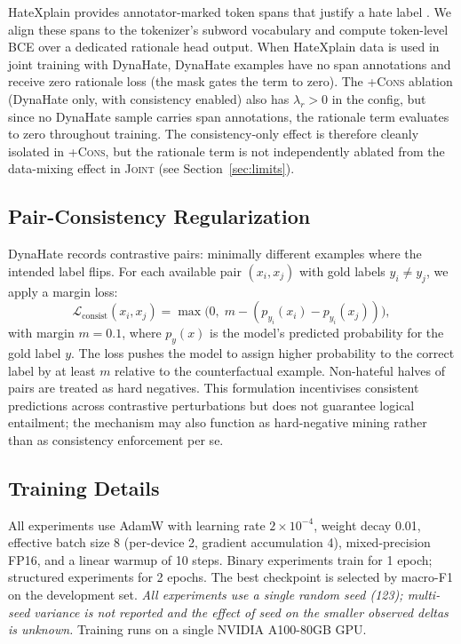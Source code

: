 \documentclass{article}
\begin{document}
HateXplain provides annotator-marked token spans that justify a hate label
\citep{mathew2021hatexplain}.
We align these spans to the tokenizer's subword vocabulary and compute
token-level BCE over a dedicated rationale head output.
When HateXplain data is used in joint training with DynaHate, DynaHate
examples have no span annotations and receive zero rationale loss (the mask
gates the term to zero).
The \textsc{+Cons} ablation (DynaHate only, with consistency enabled) also has
$\lambda_r > 0$ in the config, but since no DynaHate sample carries span
annotations, the rationale term evaluates to zero throughout training.
The consistency-only effect is therefore cleanly isolated in \textsc{+Cons},
but the rationale term is not independently ablated from the data-mixing
effect in \textsc{Joint} (see Section~\ref{sec:limits}).

\subsection{Pair-Consistency Regularization}
\label{sec:consistency}

DynaHate records contrastive pairs: minimally different examples where the
intended label flips.
For each available pair $(x_i, x_j)$ with gold labels $y_i \neq y_j$, we
apply a margin loss:
\begin{equation}
  \mathcal{L}_\text{consist}(x_i, x_j)
    = \max\!\bigl(0,\; m - (p_{y_i}(x_i) - p_{y_i}(x_j))\bigr),
\end{equation}
with margin $m=0.1$, where $p_{y}(x)$ is the model's predicted probability
for the gold label $y$.
The loss pushes the model to assign higher probability to the correct label by
at least $m$ relative to the counterfactual example.
Non-hateful halves of pairs are treated as hard negatives.
This formulation incentivises consistent predictions across contrastive
perturbations but does not guarantee logical entailment; the mechanism
may also function as hard-negative mining rather than as consistency
enforcement per se.

\subsection{Training Details}
All experiments use AdamW \citep{loshchilov2019adamw} with learning rate
$2 \times 10^{-4}$, weight decay 0.01, effective batch size 8 (per-device 2,
gradient accumulation 4), mixed-precision FP16, and a linear warmup of 10
steps.
Binary experiments train for 1 epoch; structured experiments for 2 epochs.
The best checkpoint is selected by macro-F1 on the development set.
\emph{All experiments use a single random seed (123); multi-seed variance
is not reported and the effect of seed on the smaller observed deltas is
unknown.}
Training runs on a single NVIDIA A100-80GB GPU.
\end{document}
